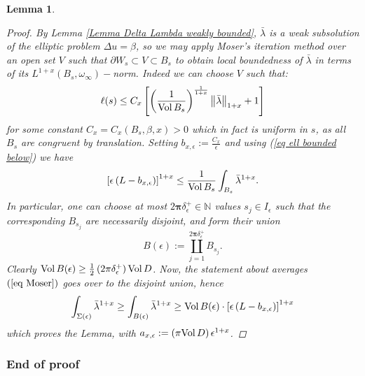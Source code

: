 \documentclass{article}
\newcommand{\func}[1]{\textnormal {#1\,}}
\newcommand{\bl}{\bar\lambda}
\newcommand{\vol}{\func{Vol}}
\newtheorem{lemma}[theorem]{Lemma}
\begin{document}
\begin{lemma}
\begin{proof}
By \emph{Lemma \ref{Lemma Delta Lambda weakly bounded}}, $\bl$ is a weak subsolution of the elliptic problem $\Delta u=\beta$, so we may apply Moser's iteration method   \cite[Theorem 8.25]{Gilb-Trud}\cite[Theorem 2]{Moser} over an open set $V$ such that $\partial W_s\subset V\subset B_s$ to obtain local boundedness of $\bl$ in terms of its $L^{1+x}(B_s,\omega_\infty)-$norm. Indeed we can choose $V$ such that:   
$$
\ell(s)
\leq 
C_x\left[
        \left( 
        \frac{1}{\vol B_s}
        \right)^{\frac{1}{1+x}}
        \left\Vert\bl\right\Vert_{1+x} +1
\right]
$$
for some constant $C_x=C_x(B_s,\beta,x)>0$ which in fact is uniform in $s$, as all $B_s$ are congruent by translation. Setting $\displaystyle b_{x,\epsilon}:=\frac{C_x}{\epsilon}$ and using (\ref{eq ell bounded below}) we have
\begin{equation}        \label{eq Moser}
        \left[
        \epsilon \left(L-b_{x,\epsilon}\right)
        \right]^{1+x}
\leq
\frac{1}{\vol B_s}\int_{B_s}\bl^{1+x}.
\end{equation}
In particular, one can choose at most $2\mathbf{\pi}\delta^+_\epsilon\in \mathbb{N}$ values $s_j\in I_\epsilon$ such that the corresponding $B_{s_j}$ are necessarily disjoint, and form their union 
\begin{displaymath}
        B\left( \epsilon \right):=\coprod\limits_{j=1}^{2\mathbf{\pi}\delta^+_\epsilon}
        B_{s_j}.
\end{displaymath}
Clearly $\vol B(\epsilon)\geq \frac{1}{2}\left(2\mathbf{\pi}\delta^+_\epsilon\right)\vol D$. Now, the statement about averages $(\ref{eq Moser})$ goes over to the disjoint union, hence
\begin{displaymath}
        \int_{\Sigma(\epsilon)}\bl^{1+x} 
        \geq \int_{B(\epsilon)}\bl^{1+x}
        \geq \vol B(\epsilon) 
        \cdot 
        \left[
        \epsilon \left(L-b_{x,\epsilon}\right)
        \right]^{1+x}
\end{displaymath}
 which proves the \emph{Lemma}, with 
 $a_{x, \epsilon} := \left(\mathbf{\pi} \vol D\right)\epsilon^{1+x}$.
\end{proof}
\end{lemma}


\subsubsection{End of proof}
\end{document}
